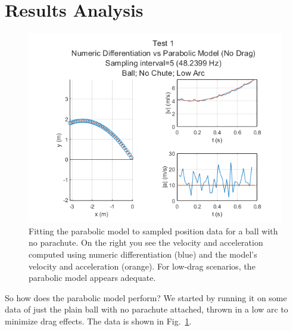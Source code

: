 \section{Results Analysis}

\begin{figure}[t]
\centering
\includegraphics[width=0.9\linewidth]{images/Analysis1_Test1_Fig5_NoDrag.png}
\caption{\label{fig:Analysis1_Test1_Fig5_NoDrag} Fitting the parabolic model to sampled position data for a ball with no parachute. On the right you see the velocity and acceleration computed using numeric differentiation (blue) and the model's velocity and acceleration (orange). For low-drag scenarios, the parabolic model appears adequate.}
\end{figure}

So how does the parabolic model perform? We started by running it on some data of just the plain ball with no parachute attached, thrown in a low arc to minimize drag effects. The data is shown in Fig.~\ref{fig:Analysis1_Test1_Fig5_NoDrag}. 